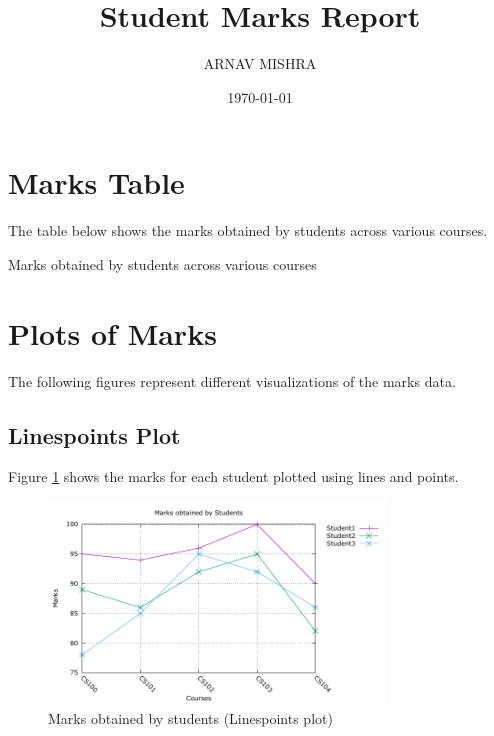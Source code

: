 \documentclass{article}
\title{Student Marks Report}
\author{ARNAV MISHRA}
\date{\today}
\begin{document}
\maketitle

\section{Marks Table}
The table below shows the marks obtained by students across various courses.

\begin{table}[h!]
    \centering
    \caption{Marks obtained by students across various courses}
\end{table}

\section{Plots of Marks}
The following figures represent different visualizations of the marks data.

\subsection{Linespoints Plot}
Figure \ref{fig:linespoints} shows the marks for each student plotted using lines and points.

\begin{figure}[H]
    \centering
    \includegraphics[width=0.8\textwidth]{linespoints.pdf}
    \caption{Marks obtained by students (Linespoints plot)}
    \label{fig:linespoints}
\end{figure}
\end{document}

